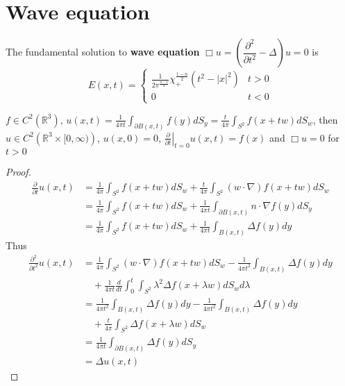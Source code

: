 \documentclass[main]{subfiles}
\begin{document}
\section{Wave equation}

\begin{definition}
The fundamental solution to \textbf{wave equation} $\Box u=\left(\dfrac{\partial^2}{\partial t^2}-\Delta\right)u=0$ is
\[E(x,t)=\begin{cases}
\frac{1}{2\pi^{\frac{n-1}{2}}}\chi_+^{\frac{1-n}{2}}(t^2-|x|^2) &t>0 \\
0 &t<0
\end{cases}\]
\end{definition}

\begin{theorem}
$f\in C^2(\mathbb R^3)$, $\displaystyle u(x,t)=\frac{1}{4\pi t}\int_{\partial B(x,t)}f(y)dS_y=\frac{t}{4\pi}\int_{S^2}f(x+tw)dS_w$, then $u\in C^2\left(\mathbb R^3\times[0,\infty)\right)$, $u(x,0)=0$, $\displaystyle\left.\frac{\partial}{\partial t}\right|_{t=0}u(x,t)=f(x)$ and $\Box u=0$ for $t>0$
\end{theorem}

\begin{proof}
\begin{align*}
\frac{\partial}{\partial t}u(x,t)&=\frac{1}{4\pi}\int_{S^2}f(x+tw)dS_w+\frac{t}{4\pi}\int_{S^2}(w\cdot\nabla)f(x+tw)dS_w \\
&=\frac{1}{4\pi}\int_{S^2}f(x+tw)dS_w+\frac{1}{4\pi t}\int_{\partial B(x,t)}n\cdot\nabla f(y)dS_y \\
&=\frac{1}{4\pi}\int_{S^2}f(x+tw)dS_w+\frac{1}{4\pi t}\int_{B(x,t)}\Delta f(y)dy
\end{align*}
Thus
\begin{align*}
\frac{\partial^2}{\partial t^2}u(x,t)&=\frac{1}{4\pi}\int_{S^2}(w\cdot\nabla)f(x+tw)dS_w-\frac{1}{4\pi t^2}\int _{B(x,t)}\Delta f(y)dy \\
&\quad+\frac{1}{4\pi t}\frac{d}{dt}\int_0^t\int_{S^2}\lambda^2\Delta f(x+\lambda w)dS_wd\lambda \\
&=\frac{1}{4\pi t^2}\int_{B(x,t)}\Delta f(y)dy-\frac{1}{4\pi t^2}\int _{B(x,t)}\Delta f(y)dy \\
&\quad+\frac{t}{4\pi }\int_{S^2}\Delta f(x+\lambda w)dS_w \\
&=\frac{1}{4\pi t}\int_{\partial B(x,t)}\Delta f(y)dS_y \\
&=\Delta u(x,t)
\end{align*}
\end{proof}
\end{document}

